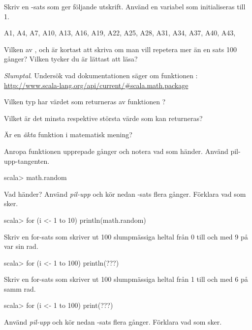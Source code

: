 {{{{\Subtask Skriv en -sats som ger följande utskrift. Använd en variabel  som initialiseras till 1.
\begin{REPLnonum}
A1, A4, A7, A10, A13, A16, A19, A22, A25, A28, A31, A34, A37, A40, A43, 
\end{REPLnonum}

\Subtask\Pen Vilken av ,  och  är kortast att skriva om man vill repetera mer än en sats 100 gånger? Vilken tycker du är lättast att läsa? 

\Task \textit{Slumptal}. Undersök vad dokumentationen säger om funktionen :\\
\url{http://www.scala-lang.org/api/current/#scala.math.package} 

\Subtask\Pen Vilken typ har värdet som returneras av funktionen ? 
 
\Subtask\Pen Vilket är det minsta respektive största värde som kan returneras? 

\Subtask\Pen Är  en \textit{äkta} funktion  i matematisk mening?

\Subtask Anropa funktionen  upprepade gånger och notera vad som händer. Använd pil-upp-tangenten.
\begin{REPLnonum}
scala> math.random
\end{REPLnonum}


\Subtask Vad händer? Använd \textit{pil-upp} och kör nedan -sats flera gånger. Förklara vad som sker.

\begin{REPLnonum}
scala> for (i <- 1 to 10) println(math.random)
\end{REPLnonum}

\Subtask Skriv en for-sats som skriver ut 100 slumpmässiga heltal från 0 till och med 9 på var sin rad. 

\begin{REPLnonum}
scala> for (i <- 1 to 100) println(???)
\end{REPLnonum}

\Subtask Skriv en for-sats som skriver ut 100 slumpmässiga heltal från 1 till och med 6 på samm rad. 

\begin{REPLnonum}
scala> for (i <- 1 to 100) print(???)
\end{REPLnonum}


\Subtask Använd \textit{pil-upp} och kör nedan -sats flera gånger. Förklara vad som sker.

}}}}
